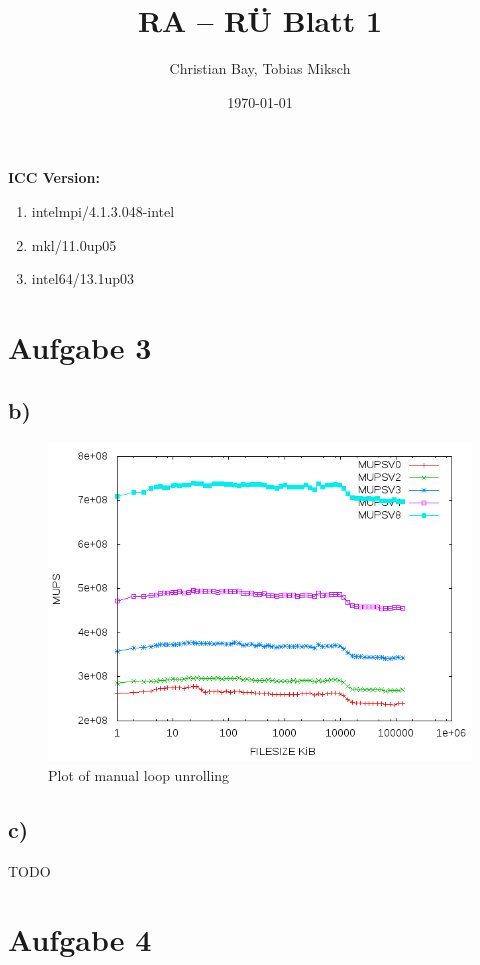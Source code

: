 \documentclass{article}
\title{RA -- R\"U Blatt 1}
\author{Christian Bay, Tobias Miksch}
\date{\today}
\begin{document}
\maketitle

\textbf{ICC Version:}
\begin{enumerate}
	\item intelmpi/4.1.3.048-intel
	\item mkl/11.0up05
	\item intel64/13.1up03
\end{enumerate}

\vspace*{6pt}

\section*{Aufgabe 3}
\subsection*{b)}

\begin{center}
	\begin{figure}[h]
	\includegraphics[scale=0.6]{pics/a3b.png}
	\caption{Plot of manual loop unrolling}
	\end{figure}
\end{center}

\subsection*{c)}
TODO

\section*{Aufgabe 4}
\end{document}
